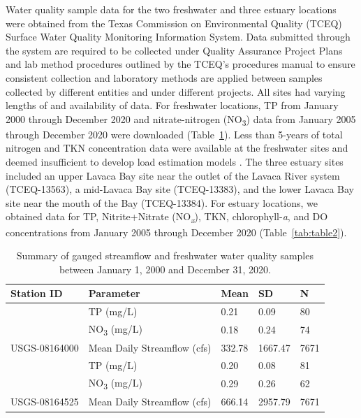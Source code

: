 \documentclass[sn-basic,referee,lineno,pdflatex]{sn-jnl}
\begin{document}
Water quality sample data for the two freshwater and three estuary
locations were obtained from the Texas Commission on Environmental
Quality (TCEQ) Surface Water Quality Monitoring Information System. Data
submitted through the system are required to be collected under Quality
Assurance Project Plans and lab method procedures outlined by the TCEQ's
procedures manual to ensure consistent collection and laboratory methods
are applied between samples collected by different entities and under
different projects. All sites had varying lengths of and availability of
data. For freshwater locations, TP from January 2000 through December
2020 and nitrate-nitrogen (NO\textsubscript{3}) data from January 2005
through December 2020 were downloaded (Table~\ref{tab:table1}). Less
than 5-years of total nitrogen and TKN concentration data were available
at the freshwater sites and deemed insufficient to develop load
estimation models
\citep{horowitzEvaluationSedimentRating2003, snelderEstimationCatchmentNutrient2017}.
The three estuary sites included an upper Lavaca Bay site near the
outlet of the Lavaca River system (TCEQ-13563), a mid-Lavaca Bay site
(TCEQ-13383), and the lower Lavaca Bay site near the mouth of the Bay
(TCEQ-13384). For estuary locations, we obtained data for TP,
Nitrite+Nitrate (NO\emph{\textsubscript{x}}), TKN, chlorophyll-\emph{a},
and DO concentrations from January 2005 through December 2020
(Table~\ref{tab:table2}).

\begin{table}

\caption{\label{tab:table1}Summary of gauged streamflow and freshwater water quality samples between January 1, 2000 and December 31, 2020.}
\centering
\begin{tabular}[t]{lllll}
\toprule
Station ID & Parameter & Mean & SD & N\\
\midrule
 & TP (mg/L) & 0.21 & 0.09 & 80\\

 & NO\textsubscript{3} (mg/L) & 0.18 & 0.24 & 74\\

\multirow{-3}{*}{\raggedright\arraybackslash USGS-08164000} & Mean Daily Streamflow (cfs) & 332.78 & 1667.47 & 7671\\
\cmidrule{1-5}
 & TP (mg/L) & 0.20 & 0.08 & 81\\

 & NO\textsubscript{3} (mg/L) & 0.29 & 0.26 & 62\\

\multirow{-3}{*}{\raggedright\arraybackslash USGS-08164525} & Mean Daily Streamflow (cfs) & 666.14 & 2957.79 & 7671\\
\bottomrule
\end{tabular}
\end{table}
\end{document}
